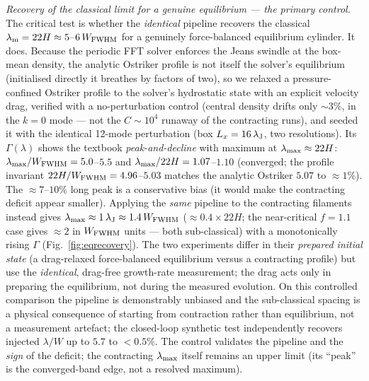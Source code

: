 \documentclass[usenatbib,twoside,twocolumn]{mnras}
\begin{document}
\emph{Recovery of the classical limit for a genuine equilibrium --- the primary control.} The critical test is whether the \emph{identical} pipeline recovers the classical $\lambda_{\rm m}=22H\approx5$--$6\,W_{\rm FWHM}$ for a genuinely force-balanced equilibrium cylinder. It does. Because the periodic FFT solver enforces the Jeans swindle at the box-mean density, the analytic Ostriker profile is not itself the solver's equilibrium (initialised directly it breathes by factors of two), so we relaxed a pressure-confined Ostriker profile to the solver's hydrostatic state with an explicit velocity drag, verified with a no-perturbation control (central density drifts only $\sim3\%$, in the $k=0$ mode --- not the $C\sim10^4$ runaway of the contracting runs), and seeded it with the identical 12-mode perturbation (box $L_x=16\,\lambda_{\rm J}$, two resolutions). Its $\Gamma(\lambda)$ shows the textbook \emph{peak-and-decline} with maximum at $\lambda_{\rm max}\approx22H$: $\lambda_{\rm max}/W_{\rm FWHM}=5.0$--$5.5$ and $\lambda_{\rm max}/22H=1.07$--$1.10$ (converged; the profile invariant $22H/W_{\rm FWHM}=4.96$--$5.03$ matches the analytic Ostriker $5.07$ to $\approx1\%$). The $\approx7$--$10\%$ long peak is a conservative bias (it would make the contracting deficit appear smaller). Applying the \emph{same} pipeline to the contracting filaments instead gives $\lambda_{\rm max}\approx1\,\lambda_{\rm J}\approx1.4\,W_{\rm FWHM}$ ($\approx0.4\times22H$; the near-critical $f=1.1$ case gives $\approx2$ in $W_{\rm FWHM}$ units --- both sub-classical) with a monotonically rising $\Gamma$ (Fig.~\ref{fig:eqrecovery}). The two experiments differ in their \emph{prepared initial state} (a drag-relaxed force-balanced equilibrium versus a contracting profile) but use the \emph{identical}, drag-free growth-rate measurement; the drag acts only in preparing the equilibrium, not during the measured evolution. On this controlled comparison the pipeline is demonstrably unbiased and the sub-classical spacing is a physical consequence of starting from contraction rather than equilibrium, not a measurement artefact; the closed-loop synthetic test independently recovers injected $\lambda/W$ up to $5.7$ to $<0.5\%$. The control validates the pipeline and the \emph{sign} of the deficit; the contracting $\lambda_{\rm max}$ itself remains an upper limit (its ``peak'' is the converged-band edge, not a resolved maximum).
\end{document}
